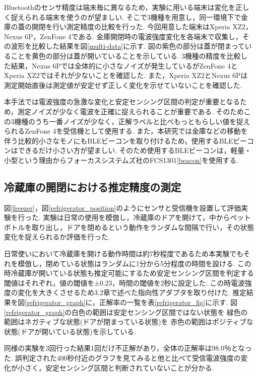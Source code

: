 \documentclass[Japanese]{dicomopapers}
\begin{document}
Bluetoothのセンサ精度は端末毎に異なるため，実験に用いる端末は変化を正しく捉えられる端末を使うのが望ましい.
そこで3機種を用意し，同一環境下で金庫の蓋の開閉を行い測定精度の比較を行った.
今回用意した端末はXperia XZ2，Nexus 6P，ZenFone 4である.
金庫開閉時の電波強度変化を各端末で収集し，その波形を比較した結果を図\ref{multi-data}に示す.
図の紫色の部分は蓋が閉まっていることを黄色の部分は蓋が開いていることを示している.
3機種の精度を比較した結果，Nexus 6Pでは全体的に小さなノイズが発生しているがZenFone 4とXperia XZ2ではそれが少ないことを確認した.
また，Xperia XZ2とNexus 6Pは測定開始直後は測定値が安定せず正しく変化を示せていないことを確認した.

本手法では電波強度の急激な変化と安定センシング区間の判定が重要となるため，測定ノイズが少なく電波を正確に捉えられることが重要である.
そのためこの3機種のうち一番ノイズが少なく，正解ラベルと比べもっともらしい値を捉えられるZenFone 4を受信機として使用する.
また，本研究では金庫などの移動を伴う比較的小さなモノにもBLEビーコンを取り付けるため，使用するBLEビーコンはできるだけ小さい方が望ましい.
そのため使用するBLEビーコンは，軽量・小型という理由からフォーカスシステムズ社のFCS1301\ref{beacon}を使用する.


\subsection{冷蔵庫の開閉における推定精度の測定}
図\ref{freezer}，図\ref{refrigerator_position}のようにセンサと受信機を設置して評価実験を行った.
実験は日常の使用を模倣し，冷蔵庫のドアを開けて，中からペットボトルを取り出し，ドアを閉めるという動作をランダムな間隔で行い，その状態変化を捉えられるか評価を行った.

日常使いにおいて冷蔵庫を開ける動作時間は約7秒程度であるため本実験でもそれを模倣し，閉めている状態はランダムに1分から5分程度の時間を設ける.
この時冷蔵庫が開いている状態も推定可能にするため安定センシング区間を判定する閾値はそれぞれ，値の閾値を±0.23，時間の閾値を2秒に設定した.
この時電波強度の変化を大きくさせるため3.2章で述べた指向性アダプタを取り付けた.
推定結果を図\ref{refrigerator_graph}に，正解率の一覧を表\ref{refrigerator_fig}に示す.
図\ref{refrigerator_graph}の白色の範囲は安定センシング区間ではない状態を 緑色の範囲はネガティブな状態(ドアが閉まっている状態)を 赤色の範囲はポジティブな状態(ドアが開いている状態)を示している.

同様の実験を3回行った結果1回だけ不正解があり，全体の正解率は98.0％となった.
誤判定された400秒付近のグラフを見てみると他と比べて受信電波強度の変化が小さく，安定センシング区間と判断されていないことが分かる.
\end{document}

